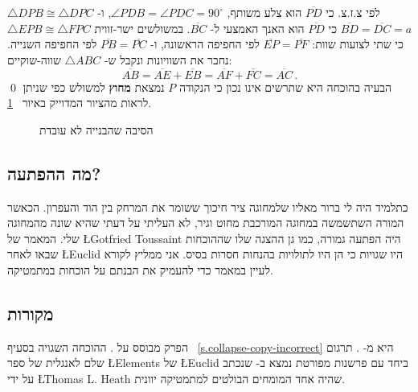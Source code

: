 $\triangle DPB\cong \triangle DPC$
לפי צ.ז.צ. כי 
$\overline{PD}$
הוא צלע משותף, 
$\angle PDB=\angle PDC=90^\circ$,
ו-%
$\overline{BD}=\overline{DC}=a$
כי 
$\overline{PD}$
הוא האנך האמצעי ל-%
$\overline{BC}$.
במשולשים ישר-זווית
$\triangle EPB\cong \triangle FPC$
כי שתי לצועות שוות:
$\overline{EP}=\overline{PF}$
לפי החפיפה הראשונה, ו-%
$\overline{PB}=\overline{PC}$
לפי החפיפה השנייה. נחבר את השוויונות ונקבל ש-%
$\triangle ABC$
שווה-שוקיים:
\[
\overline{AB}=\overline{AE}+\overline{EB}=\overline{AF}+\overline{FC}=\overline{AC}\,.
\]
\qed
הבעיה בהוכחה היא שתרשים אינו נכון כי הנקודה
$P$
נמצאת
\textbf{מחוץ}
למשולש כפי שניתן לראות מהציור המדוייק באיור%
~\ref{f.isoceles-wrong}.
\begin{figure}[htb]
\begin{center}
\caption{הסיבה שהבנייה לא עובדת}\label{f.isoceles-wrong}
\end{center}
\end{figure}

\subsection*{מה ההפתעה?}

כתלמיד היה לי ברור מאליו שלמחוגה ציר חיכוך ששומר את המרחק בין הוד והעפרון. הכאשר המורה השתשמשה במחוגה המורכבת מחוט וגיר, לא העליתי על דעתי שהיא שונה מהמחוגה שלי. המאמר של
\L{Gotfried Toussaint}
היה הפתעה גמורה, כמו גן ההצגה שלו שההוכחות שבאו לאחר 
\L{Euclid}
היו שגויות כי הן היו לתולויות בהנחות חסרות בסיס. אני ממליץ לקורא לעיין במאמר כדי להעמיק את הבנתם על הוכחות במתמטיקה.

\subsection*{מקורות}

הפרק מבוסס על
\cite{toussaint}.
ההוכחה השגויה בסעיף%
~\ref{s.collapse-copy-incorrect}
היא מ-%
\cite{rusty}.
תרגום שלם לאנגלית של ספר
\L{Elements}
של 
\L{Euclid}
ביחד עם פרשנות מפורטת נמצא ב-%
\cite{euclid}
שנכתב על ידי
\L{Thomas L. Heath}
שהיה אחד המומחים הבולטים למתמטיקה יוונית.

